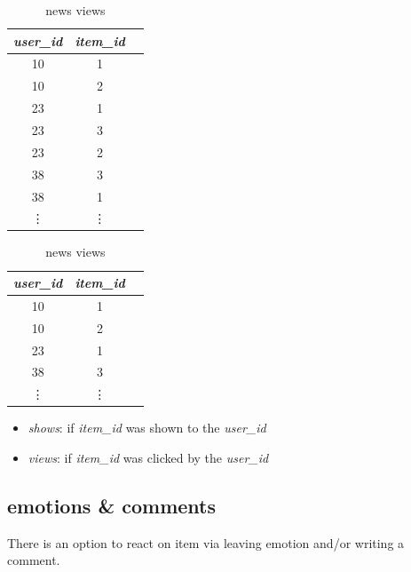 \documentclass{article}
\begin{document}
\begin{table}[h]
    \parbox{.45\textwidth}{
        \centering
        \begin{tabular}{ccc}
            \toprule

            \emph{user\_id} & \emph{item\_id} \\\midrule
            10 & 1  \\
            10 & 2  \\
            23 & 1  \\
            23 & 3  \\
            23 & 2  \\
            38 & 3  \\
            38 & 1  \\
            \vdots & \vdots  \\\bottomrule
        \end{tabular}
        \caption{news shows}
        \label{tab:show}
    }
    \hfill
    \parbox{.45\textwidth}{
        \centering
        \begin{tabular}{ccc}
            \toprule

            \emph{user\_id} & \emph{item\_id} \\\midrule
            10 & 1  \\
            10 & 2  \\
            23 & 1  \\
            38 & 3  \\
            \vdots & \vdots  \\\bottomrule
        \end{tabular}
        \caption{news views}
        \label{tab:view}
        }
\end{table}   


\begin{itemize}
    \item \emph{shows}: if \emph{item\_id} was shown to the \emph{user\_id}
    \item \emph{views}: if \emph{item\_id} was clicked by the \emph{user\_id}
\end{itemize}



\subsection*{emotions \& comments}

There is an option to react on item via leaving emotion and/or writing a comment.
\end{document}
